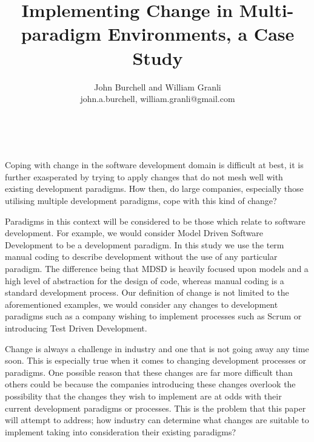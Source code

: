 \documentclass[10pt,twocolumn]{article}
\begin{document}
\overfullrule=2cm


\title{Implementing Change in Multi-paradigm Environments, a Case Study}

\author{John Burchell and William Granli \\
john.a.burchell, william.granli@gmail.com}


\maketitle
\thispagestyle{empty}




​

Coping with change in the software development domain is difficult at best, it is further exasperated by trying to apply changes that do not mesh well with existing development paradigms. How then, do large companies, especially those utilising multiple development paradigms, cope with this kind of change?

Paradigms in this context will be considered to be those which relate to software development. For example, we would consider Model Driven Software Development to be a development paradigm. In this study we use the term manual coding to describe development without the use of any particular paradigm. The difference being that MDSD is heavily focused upon models and a high level of abstraction for the design of code, whereas manual coding is a standard development process. Our definition of change is not limited to the aforementioned examples, we would consider any changes to development paradigms such as a company wishing to implement processes such as Scrum or introducing Test Driven Development.

Change is always a challenge in industry and one that is not going away any time soon. This is especially true when it comes to changing development processes or paradigms. One possible reason that these changes are far more difficult than others could be because the companies introducing these changes overlook the possibility that the changes they wish to implement are at odds with their current development paradigms or processes. This is the problem that this paper will attempt to address; how industry can determine what changes are suitable to implement taking into consideration their existing paradigms?
\end{document}
